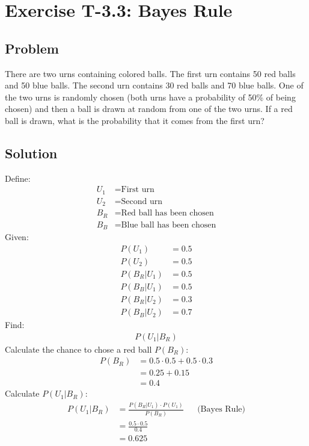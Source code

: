 \section*{Exercise T-3.3: Bayes Rule}

\subsection*{Problem}
There are two urns containing colored balls. The first urn contains 50 red balls and 50 blue balls. The second urn contains 30 red balls and 70 blue balls. One of the two urns is randomly chosen (both urns have a probability of 50\% of being chosen) and then a ball is drawn at random from one of the two urns. If a red ball is drawn, what is the probability that it comes from the first urn?


\subsection*{Solution}
Define:
\begin{align}
	U_1 &= \text{First urn}\nonumber \\
	U_2 &= \text{Second urn}\nonumber \\
	B_R &= \text{Red ball has been chosen}\nonumber \\
	B_B &= \text{Blue ball has been chosen}\nonumber
\end{align}
Given:
\begin{align}
	P(U_1) &= 0.5 \nonumber \\
	P(U_2) &= 0.5 \nonumber \\
	P(B_R|U_1) &= 0.5 \nonumber \\
	P(B_B|U_1) &= 0.5 \nonumber \\
	P(B_R|U_2) &= 0.3 \nonumber \\
	P(B_B|U_2) &= 0.7 \nonumber
\end{align}
Find:
\begin{align}
P(U_1|B_R) \nonumber
\end{align}
Calculate the chance to chose a red ball $P(B_R)$:
\begin{align}
	P(B_R) &= 0.5 \cdot 0.5 + 0.5 \cdot 0.3 \nonumber \\
	&= 0.25 + 0.15 \nonumber \\
	&= 0.4 \nonumber 
\end{align}
Calculate $P(U_1|B_R)$:
\begin{align}
P(U_1|B_R) &= \frac{P(B_R|U_1) \cdot  P(U_1)}{P(B_R)} && \text{(Bayes Rule)} \nonumber \\
&= \frac{0.5 \cdot 0.5}{0.4} \nonumber \\
&= 0.625 \nonumber
\end{align}










